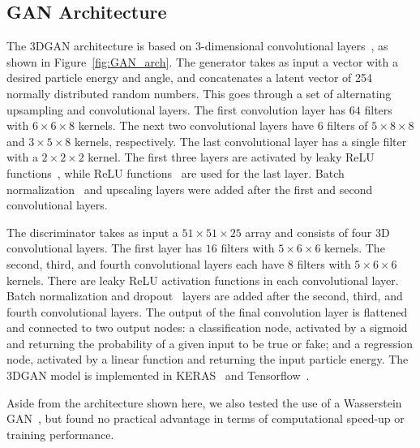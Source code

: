 \subsection{GAN Architecture}
\label{sec:GANarch}

The 3DGAN architecture is based on 3-dimensional convolutional layers~\cite{conv}, as shown in Figure~\ref{fig:GAN_arch}. The generator takes as input a vector with a desired particle energy and angle, and concatenates a latent vector of 254 normally distributed random numbers. This goes through a set of alternating upsampling and convolutional layers. The first convolution layer has $64$ filters with $6 \times 6 \times 8$ kernels. The next two convolutional layers have $6$ filters of $5 \times 8 \times 8$ and $3 \times 5 \times 8$ kernels, respectively. The last convolutional layer has a single filter with a $2 \times 2 \times 2$ kernel. The first three layers are activated by leaky ReLU functions~\cite{LeakyReLU}, while ReLU functions~\cite{ReLU} are used for the last layer. Batch normalization~\cite{batchnorm} and upscaling layers were added after the first and second convolutional layers.

The discriminator takes as input a $51  \times 51  \times 25$ array and consists of four 3D convolutional layers. The first layer has $16$ filters with $5 \times 6 \times 6$ kernels. The second, third, and fourth convolutional layers each have $8$ filters with $5 \times 6 \times 6$ kernels. There are leaky ReLU activation functions in each convolutional layer. Batch normalization and dropout~\cite{dropout} layers are added after the second, third, and fourth convolutional layers. The output of the final convolution layer is flattened and connected to two output nodes: a classification node, activated by a sigmoid and returning the probability of a given input to be true or fake; and a regression node, activated by a linear function and returning the input particle energy.
The 3DGAN model is implemented in KERAS~\cite{keras} and Tensorflow~\cite{tensorflow2015-whitepaper}.

Aside from the architecture shown here, we also tested the use of a Wasserstein GAN~\cite{wgan}, but found no practical advantage in terms of computational speed-up or training performance.

